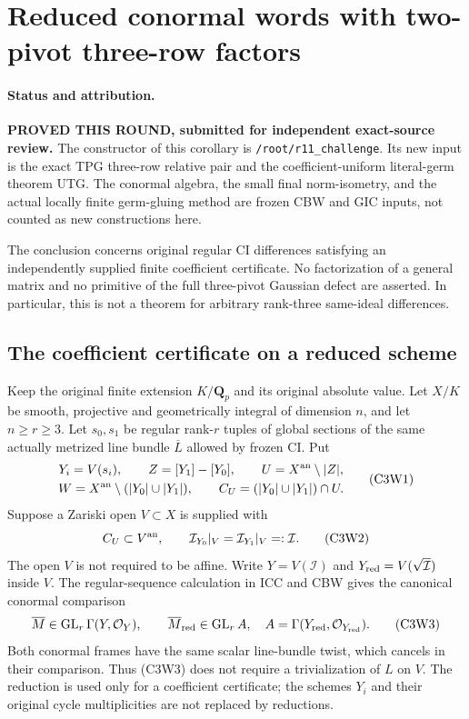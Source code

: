 \section{Reduced conormal words with two-pivot three-row factors}
\label{sec:r12-two-pivot-conormal-word}

\paragraph{Status and attribution.}
\textbf{PROVED THIS ROUND, submitted for independent exact-source review.}
The constructor of this corollary is
\texttt{/root/r11\_challenge}.  Its new input is the exact TPG
three-row relative pair and the coefficient-uniform literal-germ
theorem UTG.  The conormal algebra, the small final norm-isometry,
and the actual locally finite germ-gluing method are frozen CBW
and GIC inputs, not counted as new constructions here.

The conclusion concerns original regular CI differences satisfying
an independently supplied finite coefficient certificate.  No
factorization of a general matrix and no primitive of the full
three-pivot Gaussian defect are asserted.  In particular, this is
not a theorem for arbitrary rank-three same-ideal differences.

\subsection{The coefficient certificate on a reduced scheme}

Keep the original finite extension $K/\mathbf Q_p$ and its original
absolute value.  Let $X/K$ be smooth, projective and geometrically
integral of dimension $n$, and let $n\ge r\ge3$.  Let $s_0,s_1$ be
regular rank-$r$ tuples of global sections of the same actually
metrized line bundle $\overline L$ allowed by frozen CI.  Put
\[
 \begin{gathered}
 Y_i=V(s_i),\qquad Z=[Y_1]-[Y_0],\qquad
 U=X^{\rm an}\setminus|Z|,\\
 W=X^{\rm an}\setminus(|Y_0|\cup|Y_1|),\qquad
 C_U=(|Y_0|\cup|Y_1|)\cap U.
 \end{gathered}
 \tag{C3W1}
\]
Suppose a Zariski open $V\subset X$ is supplied with
\[
 C_U\subset V^{\rm an},\qquad
 \mathcal I_{Y_0}|_V=\mathcal I_{Y_1}|_V=:\mathcal I.
 \tag{C3W2}
\]
The open $V$ is not required to be affine.  Write
$Y=V(\mathcal I)$ and $Y_{\rm red}=V(\sqrt{\mathcal I})$ inside
$V$.  The regular-sequence calculation in ICC and CBW gives the
canonical conormal comparison
\[
 \overline M\in\operatorname{GL}_r\Gamma(Y,\mathcal O_Y),
 \qquad
 \overline M_{\rm red}\in\operatorname{GL}_r A,
 \quad A=\Gamma(Y_{\rm red},\mathcal O_{Y_{\rm red}}).
 \tag{C3W3}
\]
Both conormal frames have the same scalar line-bundle twist, which
cancels in their comparison.  Thus (C3W3) does not require a
trivialization of $L$ on $V$.  The reduction is used only for a
coefficient certificate; the schemes $Y_i$ and their original
cycle multiplicities are not replaced by reductions.

